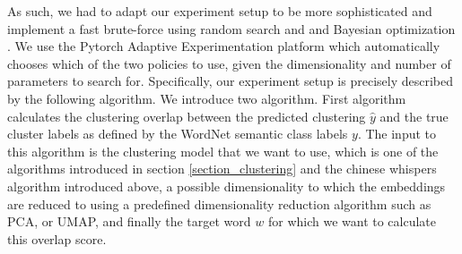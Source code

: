 \documentclass[a4paper,12pt,twoside,openright]{report}
\begin{document}
As such, we had to adapt our experiment setup to be more sophisticated and implement a fast brute-force using random search and \cite{bergstra12} and Bayesian optimization \cite{wang13}.
We use the Pytorch Adaptive Experimentation platform \cite{pyax} which automatically chooses which of the two policies to use, given the dimensionality and number of parameters to search for.
Specifically, our experiment setup is precisely described by the following algorithm.
We introduce two algorithm.
First algorithm calculates the clustering overlap between the predicted clustering $\hat{y}$ and the true cluster labels as defined by the WordNet semantic class labels $y$.
The input to this algorithm is the clustering model that we want to use, which is one of the algorithms introduced in section \eqref{section_clustering} and the chinese whispers algorithm introduced above, a possible dimensionality to which the embeddings are reduced to using a predefined dimensionality reduction algorithm such as PCA, or UMAP, and finally the target word $w$ for which we want to calculate this overlap score.
\end{document}
